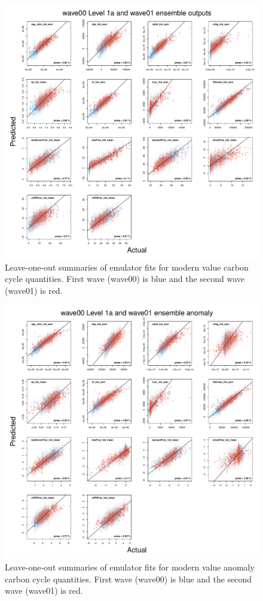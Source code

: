 \documentclass[gmd, manuscript]{copernicus}
\begin{document}
%
\begin{figure}[t]
\includegraphics[width=12cm]{./figs/figA01.pdf}
\caption{Leave-one-out summaries of emulator fits for modern value carbon cycle quantities. First wave (wave00) is blue and the second wave (wave01) is red. }
\label{fig:kmloostats_Y_wave00_level1a_wave01}
\end{figure}


%
\begin{figure}[t]
\includegraphics[width=12cm]{./figs/figA02.pdf}
\caption{Leave-one-out summaries of emulator fits for modern value anomaly carbon cycle quantities. First wave (wave00) is blue and the second wave (wave01) is red. }
\label{fig:kmloostats_YAnom_wave00_level1a_wave01}
\end{figure}
\end{document}
